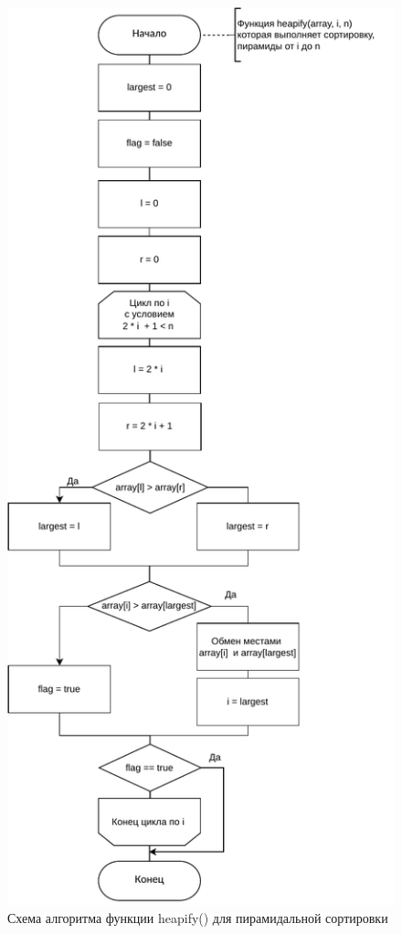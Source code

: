 \begin{figure}[h]
	\centering
	\includegraphics[height=0.8\textheight]{img/heap_2.pdf}
	\caption{Схема алгоритма функции heapify() для пирамидальной сортировки}
	\label{fig:heap_2}
\end{figure}

